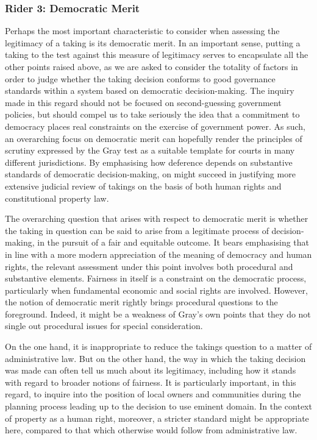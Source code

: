 \subsubsection*{Rider 3: Democratic Merit}

Perhaps the most important characteristic to consider when assessing the legitimacy of a taking is its democratic merit. In an important sense, putting a taking to the test against this measure of legitimacy serves to encapsulate all the other points raised above, as we are asked to consider the totality of factors in order to judge whether the taking decision conforms to good governance standards within a system based on democratic decision-making. The inquiry made in this regard should not be focused on second-guessing government policies, but should compel us to take seriously the idea that a commitment to democracy places real constraints on the exercise of government power. As such, an overarching focus on democratic merit can hopefully render the principles of scrutiny expressed by the Gray test as a suitable template for courts in many different jurisdictions. By emphasising how deference depends on substantive standards of democratic decision-making, on might succeed in justifying more extensive judicial review of takings on the basis of both human rights and constitutional property law.

The overarching question that arises with respect to democratic merit is whether the taking in question 
can be said to arise from a legitimate process of decision-making, in the pursuit of a fair and equitable outcome. It bears emphasising that in line with a more modern appreciation of the meaning of democracy and human rights, the relevant assessment under this point involves both procedural and substantive elements. Fairness in itself is a constraint on the democratic process, particularly when fundamental economic and social rights are involved. However, the notion of democratic merit rightly brings procedural questions to the foreground. Indeed, it might be a weakness of Gray's own points that they do not single out procedural issues for special consideration. 

On the one hand, it is inappropriate to reduce the takings question to a matter of administrative law. But on the other hand, the way in which the taking decision was made can often tell us much about its legitimacy, including how it stands with regard to broader notions of fairness. It is particularly important, in this regard, to inquire into the position of local owners and communities during the planning process leading up to the decision to use eminent domain. In the context of property as a human right, moreover, a stricter standard might be appropriate here, compared to that which otherwise would follow from administrative law.

